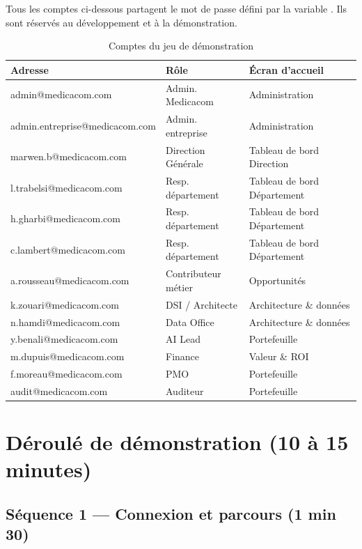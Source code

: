 Tous les comptes ci-dessous partagent le mot de passe défini par la variable
. Ils sont réservés au développement et à la démonstration.

\begin{table}[H]
\centering
\caption{Comptes du jeu de démonstration}
\label{tab:comptes}
\small
\begin{tabular}{@{}L{5.3cm} L{3.4cm} L{5.1cm}@{}}
\toprule
\textbf{Adresse} & \textbf{Rôle} & \textbf{Écran d'accueil} \\
\midrule
admin@medicacom.com            & Admin. Medicacom & Administration \\
admin.entreprise@medicacom.com & Admin. entreprise & Administration \\
marwen.b@medicacom.com         & Direction Générale & Tableau de bord Direction \\
l.trabelsi@medicacom.com       & Resp. département & Tableau de bord Département \\
h.gharbi@medicacom.com         & Resp. département & Tableau de bord Département \\
c.lambert@medicacom.com        & Resp. département & Tableau de bord Département \\
a.rousseau@medicacom.com       & Contributeur métier & Opportunités \\
k.zouari@medicacom.com         & DSI / Architecte & Architecture \& données \\
n.hamdi@medicacom.com          & Data Office & Architecture \& données \\
y.benali@medicacom.com         & AI Lead & Portefeuille \\
m.dupuis@medicacom.com         & Finance & Valeur \& ROI \\
f.moreau@medicacom.com         & PMO & Portefeuille \\
audit@medicacom.com            & Auditeur & Portefeuille \\
\bottomrule
\end{tabular}
\end{table}

\section{Déroulé de démonstration (10 à 15 minutes)}

\subsection*{Séquence 1 — Connexion et parcours (1 min 30)}

